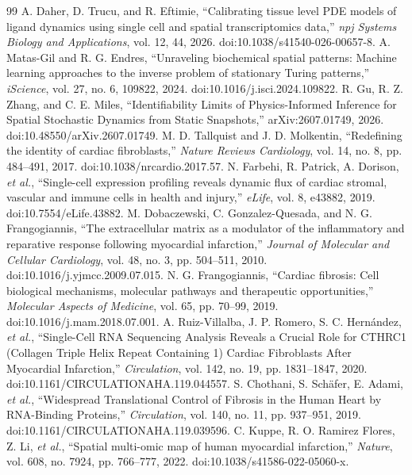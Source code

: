 \documentclass[preprint,11pt]{elsarticle}
\begin{document}
\begin{thebibliography}{99}
 A. Daher, D. Trucu, and R. Eftimie, ``Calibrating tissue level PDE models of ligand dynamics using single cell and spatial transcriptomics data,'' \emph{npj Systems Biology and Applications}, vol. 12, 44, 2026. doi:10.1038/s41540-026-00657-8.
 A. Matas-Gil and R. G. Endres, ``Unraveling biochemical spatial patterns: Machine learning approaches to the inverse problem of stationary Turing patterns,'' \emph{iScience}, vol. 27, no. 6, 109822, 2024. doi:10.1016/j.isci.2024.109822.
 R. Gu, R. Z. Zhang, and C. E. Miles, ``Identifiability Limits of Physics-Informed Inference for Spatial Stochastic Dynamics from Static Snapshots,'' arXiv:2607.01749, 2026. doi:10.48550/arXiv.2607.01749.
 M. D. Tallquist and J. D. Molkentin, ``Redefining the identity of cardiac fibroblasts,'' \emph{Nature Reviews Cardiology}, vol. 14, no. 8, pp. 484--491, 2017. doi:10.1038/nrcardio.2017.57.
 N. Farbehi, R. Patrick, A. Dorison, \emph{et al.}, ``Single-cell expression profiling reveals dynamic flux of cardiac stromal, vascular and immune cells in health and injury,'' \emph{eLife}, vol. 8, e43882, 2019. doi:10.7554/eLife.43882.
 M. Dobaczewski, C. Gonzalez-Quesada, and N. G. Frangogiannis, ``The extracellular matrix as a modulator of the inflammatory and reparative response following myocardial infarction,'' \emph{Journal of Molecular and Cellular Cardiology}, vol. 48, no. 3, pp. 504--511, 2010. doi:10.1016/j.yjmcc.2009.07.015.
 N. G. Frangogiannis, ``Cardiac fibrosis: Cell biological mechanisms, molecular pathways and therapeutic opportunities,'' \emph{Molecular Aspects of Medicine}, vol. 65, pp. 70--99, 2019. doi:10.1016/j.mam.2018.07.001.
 A. Ruiz-Villalba, J. P. Romero, S. C. Hern\'andez, \emph{et al.}, ``Single-Cell RNA Sequencing Analysis Reveals a Crucial Role for CTHRC1 (Collagen Triple Helix Repeat Containing 1) Cardiac Fibroblasts After Myocardial Infarction,'' \emph{Circulation}, vol. 142, no. 19, pp. 1831--1847, 2020. doi:10.1161/CIRCULATIONAHA.119.044557.
 S. Chothani, S. Sch\"afer, E. Adami, \emph{et al.}, ``Widespread Translational Control of Fibrosis in the Human Heart by RNA-Binding Proteins,'' \emph{Circulation}, vol. 140, no. 11, pp. 937--951, 2019. doi:10.1161/CIRCULATIONAHA.119.039596.
 C. Kuppe, R. O. Ramirez Flores, Z. Li, \emph{et al.}, ``Spatial multi-omic map of human myocardial infarction,'' \emph{Nature}, vol. 608, no. 7924, pp. 766--777, 2022. doi:10.1038/s41586-022-05060-x.

\end{thebibliography}
\end{document}
